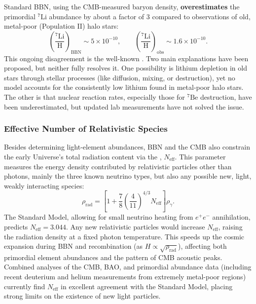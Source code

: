\begin{observationblock}
Standard BBN, using the CMB-measured baryon density, \textbf{overestimates} the primordial $^7\text{Li}$ abundance by about a factor of 3 compared to observations of old, metal-poor (Population II) halo stars:
$$
\left(\frac{^7\text{Li}}{\text{H}}\right)_{\text{BBN}} \sim 5\times10^{-10} , \qquad
\left(\frac{^7\text{Li}}{\text{H}}\right)_{\text{obs}} \sim 1.6\times10^{-10} .
$$
This ongoing disagreement is the well-known . Two main explanations have been proposed, but neither fully resolves it. One possibility is lithium depletion in old stars through stellar processes (like diffusion, mixing, or destruction), yet no model accounts for the consistently low lithium found in metal-poor halo stars. The other is that nuclear reaction rates, especially those for $^7\text{Be}$ destruction, have been underestimated, but updated lab measurements have not solved the issue.
\end{observationblock}

\subsubsection{Effective Number of Relativistic Species} \label{subsubsec:neff}

Besides determining light-element abundances, BBN and the CMB also constrain the early Universe's total radiation content via the , $N_{\text{eff}}$. This parameter measures the energy density contributed by relativistic particles other than photons, mainly the three known neutrino types, but also any possible new, light, weakly interacting species:
$$
\rho_{\text{rad}} = \left[1 + \frac{7}{8}\left(\frac{4}{11}\right)^{4/3} N_{\text{eff}}\right] \rho_\gamma .
$$
The Standard Model, allowing for small neutrino heating from $e^+e^-$ annihilation, predicts $N_{\text{eff}} = 3.044$. Any new relativistic particles would increase $N_{\text{eff}}$, raising the radiation density at a fixed photon temperature. This speeds up the cosmic expansion during BBN and recombination (as $H \propto \sqrt{\rho_{\text{rad}}}$), affecting both primordial element abundances and the pattern of CMB acoustic peaks. Combined analyses of the CMB, BAO, and primordial abundance data (including recent deuterium and helium measurements from extremely metal-poor regions) currently find $N_{\text{eff}}$ in excellent agreement with the Standard Model, placing strong limits on the existence of new light particles.

